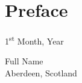 \chapter{Preface}

\lipsum[2-3]

\begin{flushright}
1\textsuperscript{st} Month, Year

Full Name \\
Aberdeen, Scotland
\end{flushright}
